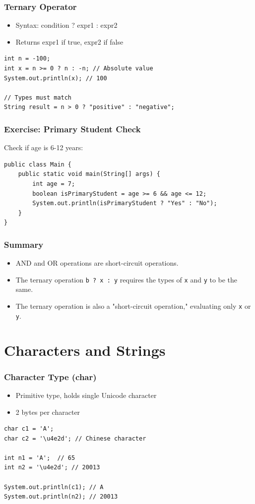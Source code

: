 \documentclass[serif, aspectratio=169]{beamer}
\begin{document}
\begin{frame}[fragile]
\frametitle{Ternary Operator}
\begin{itemize}
    \item Syntax: condition ? expr1 : expr2
    \item Returns expr1 if true, expr2 if false
\end{itemize}
\begin{lstlisting}
int n = -100;
int x = n >= 0 ? n : -n; // Absolute value
System.out.println(x); // 100

// Types must match
String result = n > 0 ? "positive" : "negative";
\end{lstlisting}
\end{frame}

\begin{frame}[fragile]
\frametitle{Exercise: Primary Student Check}
Check if age is 6-12 years:
\begin{lstlisting}
public class Main {
    public static void main(String[] args) {
        int age = 7;
        boolean isPrimaryStudent = age >= 6 && age <= 12;
        System.out.println(isPrimaryStudent ? "Yes" : "No");
    }
}
\end{lstlisting}
\end{frame}

\begin{frame}[fragile]
\frametitle{Summary}
\begin{itemize}
    \item AND and OR operations are short-circuit operations.
    \item The ternary operation \texttt{b ? x : y} requires the types of \texttt{x} and \texttt{y} to be the same.
    \item The ternary operation is also a "short-circuit operation," evaluating only \texttt{x} or \texttt{y}.
\end{itemize}
\end{frame}

\section{Characters and Strings}
\begin{frame}[fragile]
\frametitle{Character Type (char)}
\begin{itemize}
    \item Primitive type, holds single Unicode character
    \item 2 bytes per character
\end{itemize}
\begin{lstlisting}
char c1 = 'A';
char c2 = '\u4e2d'; // Chinese character

int n1 = 'A';  // 65
int n2 = '\u4e2d'; // 20013

System.out.println(c1); // A
System.out.println(n2); // 20013
\end{lstlisting}
\end{frame}
\end{document}
